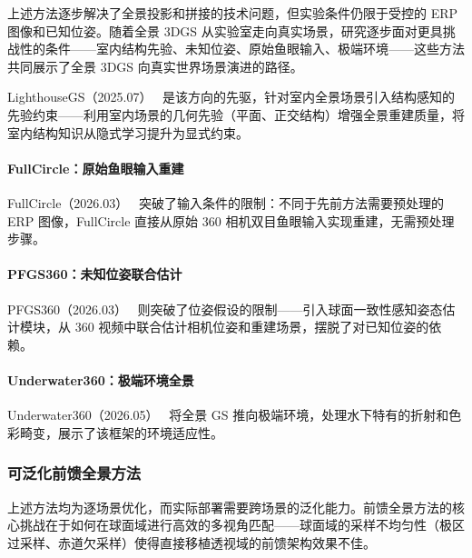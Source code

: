 上述方法逐步解决了全景投影和拼接的技术问题，但实验条件仍限于受控的 ERP 图像和已知位姿。随着全景 3DGS 从实验室走向真实场景，研究逐步面对更具挑战性的条件——室内结构先验、未知位姿、原始鱼眼输入、极端环境——这些方法共同展示了全景 3DGS 向真实世界场景演进的路径。

LighthouseGS（2025.07）~\cite{2507_06109} 是该方向的先驱，针对室内全景场景引入结构感知的先验约束——利用室内场景的几何先验（平面、正交结构）增强全景重建质量，将室内结构知识从隐式学习提升为显式约束。

\paragraph{FullCircle：原始鱼眼输入重建}
FullCircle（2026.03）~\cite{2603_22572} 突破了输入条件的限制：不同于先前方法需要预处理的 ERP 图像，FullCircle 直接从原始 360\textdegree{} 相机双目鱼眼输入实现重建，无需预处理步骤。

\paragraph{PFGS360：未知位姿联合估计}
PFGS360（2026.03）~\cite{2603_23324} 则突破了位姿假设的限制——引入球面一致性感知姿态估计模块，从 360\textdegree{} 视频中联合估计相机位姿和重建场景，摆脱了对已知位姿的依赖。

\paragraph{Underwater360：极端环境全景}
Underwater360（2026.05）~\cite{2605_26447} 将全景 GS 推向极端环境，处理水下特有的折射和色彩畸变，展示了该框架的环境适应性。

\subsubsection{可泛化前馈全景方法}

上述方法均为逐场景优化，而实际部署需要跨场景的泛化能力。前馈全景方法的核心挑战在于如何在球面域进行高效的多视角匹配——球面域的采样不均匀性（极区过采样、赤道欠采样）使得直接移植透视域的前馈架构效果不佳。

